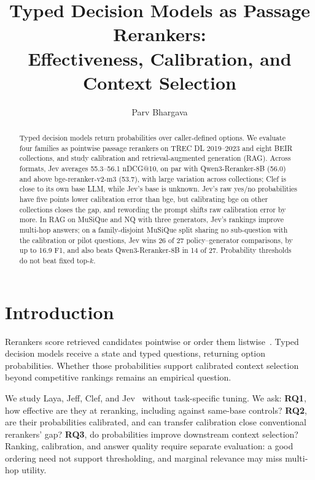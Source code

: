 \documentclass[sigconf,nonacm]{acmart}
\begin{document}
\title{Typed Decision Models as Passage Rerankers:\\Effectiveness, Calibration, and Context Selection}
\author{Parv Bhargava}

\begin{abstract}
Typed decision models return probabilities over caller-defined options. We evaluate four families as pointwise passage rerankers on TREC DL 2019--2023 and eight BEIR collections, and study calibration and retrieval-augmented generation (RAG). Across formats, Jev averages 55.3--56.1 nDCG@10, on par with Qwen3-Reranker-8B (56.0) and above bge-reranker-v2-m3 (53.7), with large variation across collections; Clef is close to its own base LLM, while Jev's base is unknown. Jev's raw yes/no probabilities have five points lower calibration error than bge, but calibrating bge on other collections closes the gap, and rewording the prompt shifts raw calibration error by more. In RAG on MuSiQue and NQ with three generators, Jev's rankings improve multi-hop answers; on a family-disjoint MuSiQue split sharing no sub-question with the calibration or pilot questions, Jev wins 26 of 27 policy--generator comparisons, by up to 16.9 F1, and also beats Qwen3-Reranker-8B in 14 of 27. Probability thresholds do not beat fixed top-$k$.
\end{abstract}
\maketitle

\section{Introduction}
Rerankers score retrieved candidates pointwise or order them listwise~\cite{sun2023rankgpt,qwen3embedding}. Typed decision models receive a state and typed questions, returning option probabilities. Whether those probabilities support calibrated context selection beyond competitive rankings remains an empirical question.

We study Laya, Jeff, Clef, and Jev~\cite{laya,jeff,clef,jev} without task-specific tuning. We ask: \textbf{RQ1}, how effective are they at reranking, including against same-base controls? \textbf{RQ2}, are their probabilities calibrated, and can transfer calibration close conventional rerankers' gap? \textbf{RQ3}, do probabilities improve downstream context selection? Ranking, calibration, and answer quality require separate evaluation: a good ordering need not support thresholding, and marginal relevance may miss multi-hop utility.
\end{document}
